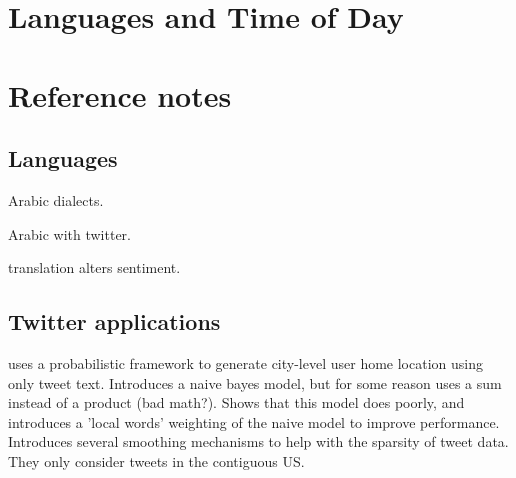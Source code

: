 \documentclass{article}
\begin{document}
\newpage
\appendix
\section{Languages and Time of Day}
\noindent

\noindent

\noindent

\noindent

\noindent

\noindent

\noindent

\noindent

\noindent

\noindent

\noindent

\noindent



\newpage
\section{Reference notes}


\subsection{Languages}

\citet{zaidan2014arabic} Arabic dialects.

\citet{refaee2014arabic} Arabic with twitter.

\citet{mohammad2016translation} translation alters sentiment.


\subsection{Twitter applications}

\citet{cheng2010you} uses a probabilistic framework to generate city-level user home location using only tweet text.
Introduces a naive bayes model, but for some reason uses a sum instead of a product (bad math?).
Shows that this model does poorly,
and introduces a 'local words' weighting of the naive model to improve performance.
Introduces several smoothing mechanisms to help with the sparsity of tweet data.
They only consider tweets in the contiguous US.
\end{document}
